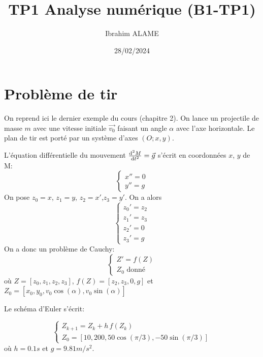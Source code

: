 \documentclass{article}
\title{TP1 Analyse numérique (B1-TP1)}
\author{Ibrahim ALAME}
\date{28/02/2024}
\def \de {{\rm d}}
\begin{document}
\maketitle

\section{Problème de tir}  
  On reprend ici le dernier exemple du cours (chapitre 2). On lance un projectile de masse $m$ avec une vitesse initiale $\vec{v_0}$ faisant un angle $\alpha$ avec l'axe horizontale. Le plan de tir est porté par un système d'axes $(O;x,y)$.
\begin{center}
 \end{center}

 L'équation différentielle du mouvement $\frac{\de^2 M}{\de t^2}=\vec g$ s'écrit  en coordonnées $x$, $y$ de M: 
  \[\left\{\begin{array}{l}
  x''=0\\
  y''=g
  \end{array}\right.\]
  On pose $z_0=x$, $z_1=y$, $z_2=x'$,$z_3=y'$. On a alors
  \[\left\{\begin{array}{l}
  z_0'=z_2\\
  z_1'=z_3\\
  z_2'=0\\
  z_3'=g
  \end{array}\right.\]
  On a donc un problème de Cauchy:
  \[\left\{\begin{array}{l}
  Z'=f(Z)\\
  Z_0 \mbox{ donné}
  \end{array}\right.\]
  où $Z=[z_0,z_1,z_2,z_3]$, $f(Z)=[z_2,z_3,0,g]$ et $Z_0=[x_0,y_0,v_0\cos(\alpha),v_0\sin(\alpha)]$
  
  Le schéma d'Euler s'écrit:
  
  \[\left\{\begin{array}{l}
  Z_{k+1}=Z_k+h\,f(Z_k)\\
  Z_0 =[10,200,50\cos(\pi/3),-50\sin(\pi/3)]
  \end{array}\right.\]
  où $h=0.1s$ et $g=9.81 m/s^2$.
  
\end{document}
